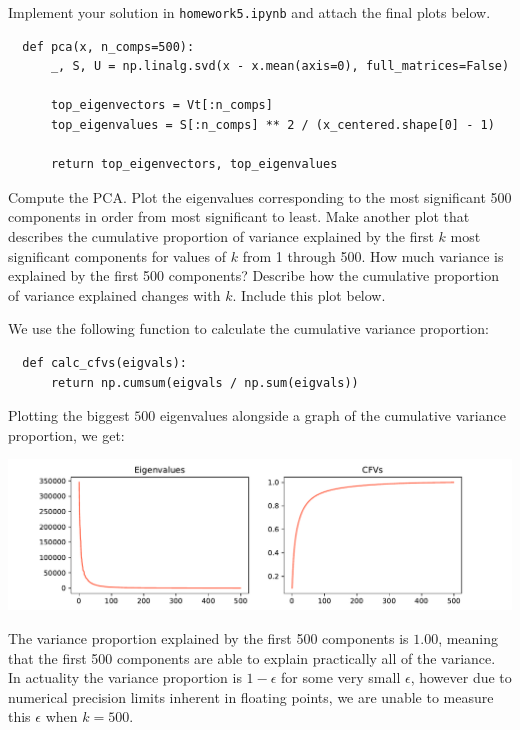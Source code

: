 \documentclass[expanded]{lkx_pset}
\begin{document}
\begin{parts}
	\begin{part}{}
		Implement your solution in \texttt{homework5.ipynb} and attach the final plots below.
	\end{part}

	\begin{verbatim}
  def pca(x, n_comps=500):
      _, S, U = np.linalg.svd(x - x.mean(axis=0), full_matrices=False)

      top_eigenvectors = Vt[:n_comps]
      top_eigenvalues = S[:n_comps] ** 2 / (x_centered.shape[0] - 1)
      
      return top_eigenvectors, top_eigenvalues 
  \end{verbatim}

	\begin{part}{1} Compute the PCA. Plot the eigenvalues corresponding to the most
		significant 500 components in order from most significant to
		least. Make another plot that describes the cumulative proportion of
		variance explained by the first $k$ most significant components for
		values of $k$ from 1 through 500.  How much variance is explained by
		the first 500 components?  Describe how the cumulative proportion of
		variance explained changes with $k$.  Include this plot below.
	\end{part}

	We use the following function to calculate the cumulative variance proportion:
	\begin{verbatim}
  def calc_cfvs(eigvals):
      return np.cumsum(eigvals / np.sum(eigvals))
  \end{verbatim}

	Plotting the biggest $500$ eigenvalues alongside a graph of the cumulative variance proportion, we get:
	\begin{center}
		\includegraphics[scale=0.7]{figures/p3_cfvs.pdf}
	\end{center}
	The variance proportion explained by the first 500 components is $1.00$, meaning that the first 500 components are able to explain practically all of the variance. In actuality the variance proportion is $1 - \epsilon$ for some very small $\epsilon$, however due to numerical precision limits inherent in floating points, we are unable to measure this $\epsilon$ when $k=500$.


\end{parts}
\end{document}

